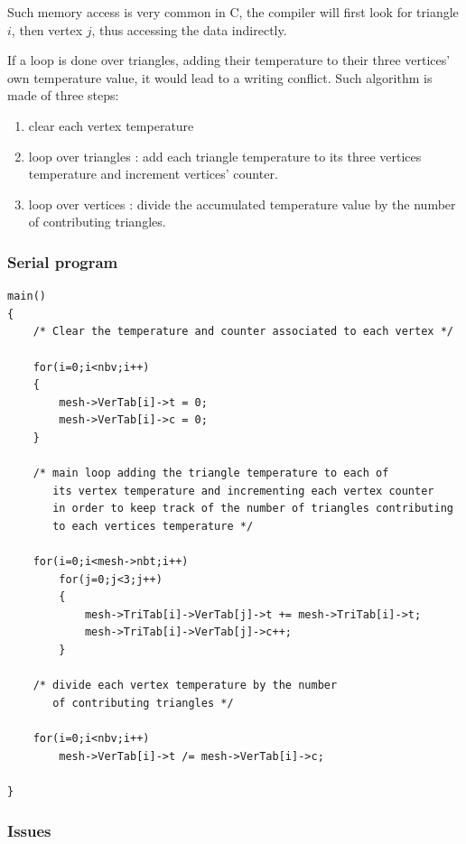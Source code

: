 \documentclass[a4paper,12pt]{article}
\begin{document}
Such memory access is very common in C, the compiler will first look for triangle $i$, then vertex $j$, thus accessing the data indirectly.

If a loop is done over triangles, adding their temperature to their three vertices' own temperature value, it would lead to a writing conflict. Such algorithm is made of three steps:

\begin{enumerate}
	\item clear each vertex temperature
	\item loop over triangles : add each triangle temperature to its three vertices temperature and increment vertices' counter.
	\item loop over vertices : divide the accumulated temperature value by the number of contributing triangles.
\end{enumerate}

\subsubsection{Serial program}

\begin{tt}
\begin{verbatim}
main()
{
    /* Clear the temperature and counter associated to each vertex */

    for(i=0;i<nbv;i++)
    {
        mesh->VerTab[i]->t = 0;
        mesh->VerTab[i]->c = 0;
    }

    /* main loop adding the triangle temperature to each of
       its vertex temperature and incrementing each vertex counter
       in order to keep track of the number of triangles contributing
       to each vertices temperature */

    for(i=0;i<mesh->nbt;i++)
        for(j=0;j<3;j++)
        {
            mesh->TriTab[i]->VerTab[j]->t += mesh->TriTab[i]->t;
            mesh->TriTab[i]->VerTab[j]->c++;
        }

    /* divide each vertex temperature by the number
       of contributing triangles */

    for(i=0;i<nbv;i++)
        mesh->VerTab[i]->t /= mesh->VerTab[i]->c;

}
\end{verbatim}
\end{tt}
\normalfont

\subsubsection{Issues}
\end{document}
